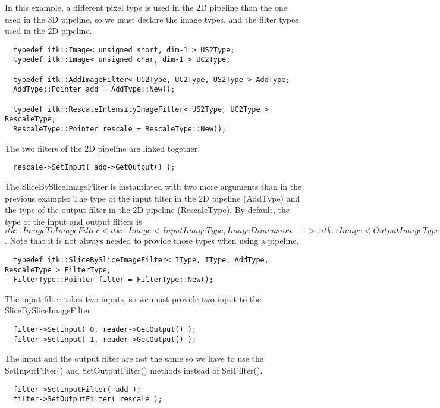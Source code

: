\documentclass{InsightArticle}
\begin{document}
In this example, a different pixel type is used in the 2D pipeline than the one used in the 3D pipeline, so we must declare the image types, and the filter types used in the 2D pipeline.

\small \begin{verbatim}
  typedef itk::Image< unsigned short, dim-1 > US2Type;
  typedef itk::Image< unsigned char, dim-1 > UC2Type;

  typedef itk::AddImageFilter< UC2Type, UC2Type, US2Type > AddType;
  AddType::Pointer add = AddType::New();
  
  typedef itk::RescaleIntensityImageFilter< US2Type, UC2Type > RescaleType;
  RescaleType::Pointer rescale = RescaleType::New();
\end{verbatim} \normalsize

The two filters of the 2D pipeline are linked together.

\small \begin{verbatim}
  rescale->SetInput( add->GetOutput() );
\end{verbatim} \normalsize

The SliceBySliceImageFilter is instantiated with two more arguments than in the previous example: The type of the input filter in the 2D pipeline (AddType) and the type of the output filter in the 2D pipeline (RescaleType). By default, the type of the input and output filters is $itk::ImageToImageFilter< itk::Image< InputImageType, ImageDimension - 1 >,  itk::Image< OutputImageType, ImageDimension - 1 > >$. Note that it is not always needed to provide those types when using a pipeline.

\small \begin{verbatim}
  typedef itk::SliceBySliceImageFilter< IType, IType, AddType, RescaleType > FilterType;
  FilterType::Pointer filter = FilterType::New();
\end{verbatim} \normalsize

The input filter takes two inputs, so we must provide two input to the SliceBySliceImageFilter.

\small \begin{verbatim}
  filter->SetInput( 0, reader->GetOutput() );
  filter->SetInput( 1, reader->GetOutput() );
\end{verbatim} \normalsize

The input and the output filter are not the same so we have to use the SetInputFilter() and SetOutputFilter() methods instead of SetFilter().

\small \begin{verbatim}
  filter->SetInputFilter( add );
  filter->SetOutputFilter( rescale );
\end{verbatim} \normalsize
\end{document}
